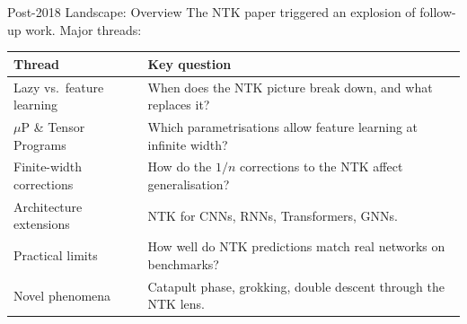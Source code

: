 \documentclass[aspectratio=169, 10pt]{beamer}
\begin{document}
\begin{frame}{Post-2018 Landscape: Overview}
  The NTK paper triggered an explosion of follow-up work. Major threads:

  \vspace{0.4em}
  \renewcommand{\arraystretch}{1.3}
  \begin{tabular}{lp{7.5cm}}
    \toprule
    \textbf{Thread} & \textbf{Key question} \\
    \midrule
    Lazy vs.\ feature learning & When does the NTK picture break down, and what replaces it? \\
    $\mu$P \& Tensor Programs & Which parametrisations allow feature learning at infinite width? \\
    Finite-width corrections & How do the $1/n$ corrections to the NTK affect generalisation? \\
    Architecture extensions & NTK for CNNs, RNNs, Transformers, GNNs. \\
    Practical limits & How well do NTK predictions match real networks on benchmarks? \\
    Novel phenomena & Catapult phase, grokking, double descent through the NTK lens. \\
    \bottomrule
  \end{tabular}
\end{frame}
\end{document}
